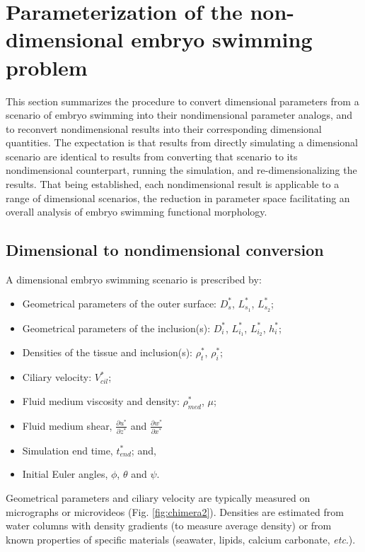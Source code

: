 \documentclass[10pt,a4paper]{article}
\def\p{\partial}
\def\etc{\emph{etc}.\xspace}
\begin{document}
\section{Parameterization of the non-dimensional embryo swimming problem}\label{NDparsSect}
This section summarizes the procedure to convert dimensional parameters from a scenario of embryo swimming into their nondimensional parameter analogs, and to reconvert nondimensional results into their corresponding dimensional quantities.
The expectation is that results from directly simulating a dimensional scenario are identical to results from converting that scenario to its nondimensional counterpart, running the simulation, and re-dimensionalizing the results.
That being established, each nondimensional result is applicable to a range of dimensional scenarios, the reduction in parameter space facilitating an overall analysis of embryo swimming functional morphology.

\subsection{Dimensional to nondimensional conversion}
A dimensional embryo swimming scenario is prescribed by:
\begin{itemize}
	\item Geometrical parameters of the outer surface: $D^*_s$, $L^*_{s_1}$, $L^*_{s_2}$; 
	\item Geometrical parameters of the inclusion(s): $D^*_{i}$, $L^*_{i_1}$, $L^*_{i_2}$, $h^*_i$; 
	\item Densities of the tissue and inclusion(s): $\rho^*_t$, $\rho^*_{i}$; 
	\item Ciliary velocity: $V^*_{cil}$;
	\item Fluid medium viscosity and density: $\rho^*_{med}$, $\mu$;
	\item Fluid medium shear, $\frac{\p u^*}{\p z^*}$ and $\frac{\p w^*}{\p x^*}$
	\item Simulation end time, $t^*_{end}$; and,
	\item Initial Euler angles, $\phi$, $\theta$ and $\psi$. 
\end{itemize}
Geometrical parameters and ciliary velocity are typically measured on micrographs or microvideos (Fig. \ref{fig:chimera2}).
Densities are estimated from water columns with density gradients (to measure average density) or from known properties of specific materials (seawater, lipids, calcium carbonate, \etc).
\end{document}
